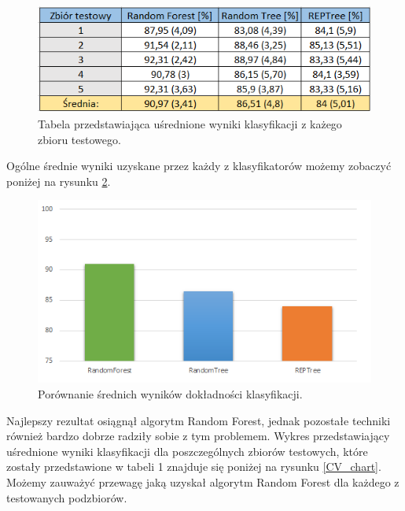 \documentclass[conference]{IEEEtran}
\begin{document}
\begin{figure}[htbp]
\centerline{\includegraphics[scale=0.75]{pic/glowna_tabela.png}}
\caption{Tabela przedstawiająca uśrednione wyniki klasyfikacji z każego zbioru testowego.}
\label{mainTable}
\end{figure}

Ogólne średnie wyniki uzyskane przez każdy z klasyfikatorów możemy zobaczyć poniżej na rysunku \ref{accuracy}.

\begin{figure}[htbp]
\centerline{\includegraphics[scale=0.8]{pic/accuracy.png}}
\caption{Porównanie średnich wyników dokładności klasyfikacji.}
\label{accuracy}
\end{figure}

Najlepszy rezultat osiągnął algorytm Random Forest, jednak pozostałe techniki również bardzo dobrze radziły sobie z tym problemem. Wykres przedstawiający uśrednione wyniki klasyfikacji dla poszczególnych zbiorów testowych, które zostały przedstawione w tabeli 1 znajduje się poniżej na rysunku \ref{CV_chart}. Możemy zauważyć przewagę jaką uzyskał algorytm Random Forest dla każdego z testowanych podzbiorów. 
\end{document}
